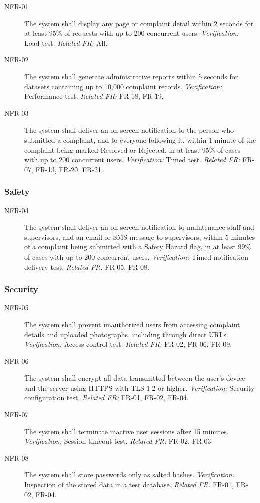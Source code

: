 \begin{description}
  \item[NFR-01] The system shall display any page or complaint detail within 2 seconds for at least 95\% of requests with up to 200 concurrent users. \textit{Verification:} Load test. \textit{Related FR:} All.
  \item[NFR-02] The system shall generate administrative reports within 5 seconds for datasets containing up to 10,000 complaint records. \textit{Verification:} Performance test. \textit{Related FR:} FR-18, FR-19.
  \item[NFR-03] The system shall deliver an on-screen notification to the person who submitted a complaint, and to everyone following it, within 1 minute of the complaint being marked Resolved or Rejected, in at least 95\% of cases with up to 200 concurrent users. \textit{Verification:} Timed test. \textit{Related FR:} FR-07, FR-13, FR-20, FR-21.
\end{description}

\subsubsection*{Safety}

\begin{description}
  \item[NFR-04] The system shall deliver an on-screen notification to maintenance staff and supervisors, and an email or SMS message to supervisors, within 5 minutes of a complaint being submitted with a Safety Hazard flag, in at least 99\% of cases with up to 200 concurrent users. \textit{Verification:} Timed notification delivery test. \textit{Related FR:} FR-05, FR-08.
\end{description}

\subsubsection*{Security}

\begin{description}
  \item[NFR-05] The system shall prevent unauthorized users from accessing complaint details and uploaded photographs, including through direct URLs. \textit{Verification:} Access control test. \textit{Related FR:} FR-02, FR-06, FR-09.
  \item[NFR-06] The system shall encrypt all data transmitted between the user's device and the server using HTTPS with TLS 1.2 or higher. \textit{Verification:} Security configuration test. \textit{Related FR:} FR-01, FR-02, FR-04.
  \item[NFR-07] The system shall terminate inactive user sessions after 15 minutes. \textit{Verification:} Session timeout test. \textit{Related FR:} FR-02, FR-03.
  \item[NFR-08] The system shall store passwords only as salted hashes. \textit{Verification:} Inspection of the stored data in a test database. \textit{Related FR:} FR-01, FR-02, FR-04.
\end{description}

